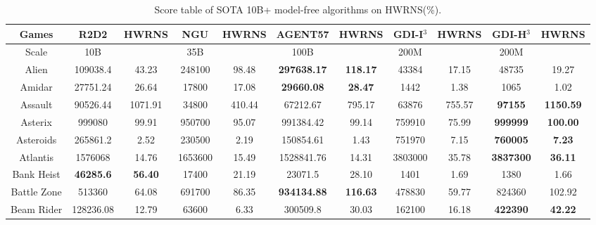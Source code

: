 \documentclass[nohyperref]{article}
\theoremstyle{plain}
\begin{document}
\begin{table}[!hb]
\footnotesize
\begin{center}
\caption{Score table of SOTA 10B+ model-free algorithms on HWRNS(\%).}
\label{Tab:Score table of SOTA 10B+ model-free algorithms on HWRNS.}
\setlength{\tabcolsep}{1.0pt}
\begin{tabular}{|c| c c| c c| c c| c c| c c| }
\hline
 Games & R2D2 & HWRNS & NGU & HWRNS & AGENT57 & HWRNS & GDI-I$^3$ & HWRNS & GDI-H$^3$ & HWRNS \\
\hline
Scale  & 10B   &        & 35B &         & 100B     &        & 200M &  &    200M   &\\
\hline
 Alien              & 109038.4          & 43.23       & 248100          & 98.48          & \textbf{297638.17}   &\textbf{118.17}         &43384             &17.15   &48735             &19.27    \\
 Amidar             & 27751.24          & 26.64       & 17800           & 17.08          & \textbf{29660.08}    &\textbf{28.47}          &1442              &1.38    &1065              &1.02    \\
 Assault            & 90526.44          & 1071.91     & 34800           & 410.44         & 67212.67             &795.17         &63876             &755.57  &\textbf{97155}             &\textbf{1150.59}    \\
 Asterix            & 999080   & 99.91       & 950700          & 95.07          & 991384.42            &99.14          &759910            &75.99   &\textbf{999999}            &\textbf{100.00}    \\
 Asteroids          & 265861.2          & 2.52        & 230500          & 2.19           & 150854.61            &1.43           &751970     &7.15    &\textbf{760005}            &\textbf{7.23}    \\
 Atlantis           & 1576068           & 14.76       & 1653600         & 15.49          & 1528841.76           &14.31          &3803000    &35.78   &\textbf{3837300}           &\textbf{36.11}    \\
 Bank Heist         & \textbf{46285.6}  & \textbf{56.40}       & 17400           & 21.19          & 23071.5              &28.10          &1401              &1.69    &1380              &1.66    \\
 Battle Zone        & 513360            & 64.08       & 691700          & 86.35          & \textbf{934134.88}   &\textbf{116.63}         &478830            &59.77   &824360            &102.92    \\
 Beam Rider         & 128236.08         & 12.79       & 63600           & 6.33           & 300509.8    &30.03          &162100            &16.18   &\textbf{422390}            &\textbf{42.22}    \\

\end{tabular}
\end{center}
\end{table}
\end{document}
